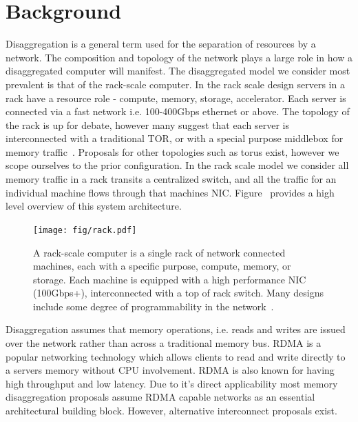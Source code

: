 
\section{Background}

Disaggregation is a general term used for the separation of resources by a
network. The composition and topology of the network plays a large role in how a
disaggregated computer will manifest. The disaggregated model we consider most
prevalent is that of the rack-scale computer. In the rack scale design servers
in a rack have a resource role - compute, memory, storage, accelerator. Each
server is connected via a fast network i.e. 100-400Gbps ethernet or above. The
topology of the rack is up for debate, however many suggest that each server is
interconnected with a traditional TOR, or with a special purpose middlebox for
memory traffic~\cite{disandapp}. Proposals for other topologies such as torus
exist, however we scope ourselves to the prior configuration. In the rack scale
model we consider all memory traffic in a rack transits a centralized switch,
and all the traffic for an individual machine flows through that machines NIC.
Figure~\cite{fig:rack-scale} provides a high level overview of this system
architecture.


\begin{figure}
    \begin{centering}
    \texttt{[image: fig/rack.pdf]}

    \caption{ A rack-scale computer is a single rack of network connected
    machines, each with a specific purpose, compute, memory, or storage. Each
    machine is equipped with a high performance NIC (100Gbps+), interconnected
    with a top of rack switch. Many designs include some degree of
    programmability in the network~\cite{disandapp}.
    }
    \end{centering}
    \label{fig:rack-scale}
\end{figure}

Disaggregation assumes that memory operations, i.e. reads and writes are issued
over the network rather than across a traditional memory bus. RDMA is a popular
networking technology which allows clients to read and write directly to a
servers memory without CPU involvement. RDMA is also known for having high
throughput and low latency. Due to it's direct applicability most memory
disaggregation proposals assume RDMA capable networks as an essential
architectural building block. However, alternative interconnect proposals exist.


